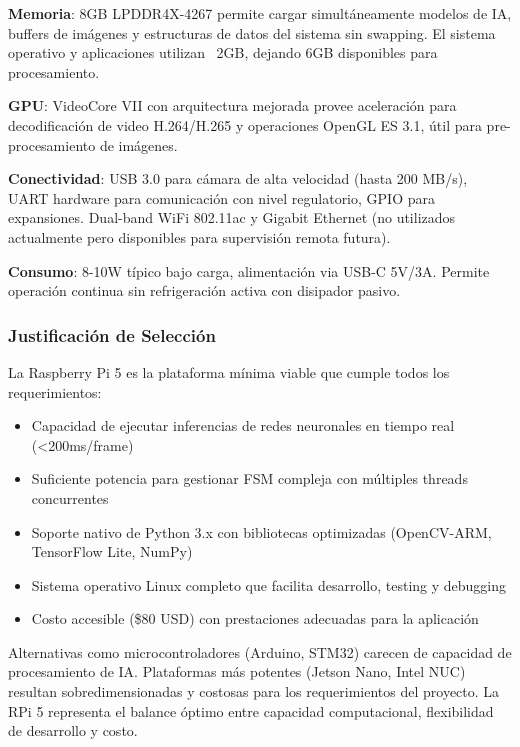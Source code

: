 \textbf{Memoria}: 8GB LPDDR4X-4267 permite cargar simultáneamente modelos de IA, buffers de imágenes y estructuras de datos del sistema sin swapping. El sistema operativo y aplicaciones utilizan ~2GB, dejando 6GB disponibles para procesamiento.

\textbf{GPU}: VideoCore VII con arquitectura mejorada provee aceleración para decodificación de video H.264/H.265 y operaciones OpenGL ES 3.1, útil para pre-procesamiento de imágenes.

\textbf{Conectividad}: USB 3.0 para cámara de alta velocidad (hasta 200 MB/s), UART hardware para comunicación con nivel regulatorio, GPIO para expansiones. Dual-band WiFi 802.11ac y Gigabit Ethernet (no utilizados actualmente pero disponibles para supervisión remota futura).

\textbf{Consumo}: 8-10W típico bajo carga, alimentación via USB-C 5V/3A. Permite operación continua sin refrigeración activa con disipador pasivo.

\subsubsection{Justificación de Selección}

La Raspberry Pi 5 es la plataforma mínima viable que cumple todos los requerimientos:

\begin{itemize}
    \item Capacidad de ejecutar inferencias de redes neuronales en tiempo real (<200ms/frame)
    \item Suficiente potencia para gestionar FSM compleja con múltiples threads concurrentes
    \item Soporte nativo de Python 3.x con bibliotecas optimizadas (OpenCV-ARM, TensorFlow Lite, NumPy)
    \item Sistema operativo Linux completo que facilita desarrollo, testing y debugging
    \item Costo accesible (\$80 USD) con prestaciones adecuadas para la aplicación
\end{itemize}

Alternativas como microcontroladores (Arduino, STM32) carecen de capacidad de procesamiento de IA. Plataformas más potentes (Jetson Nano, Intel NUC) resultan sobredimensionadas y costosas para los requerimientos del proyecto. La RPi 5 representa el balance óptimo entre capacidad computacional, flexibilidad de desarrollo y costo.
